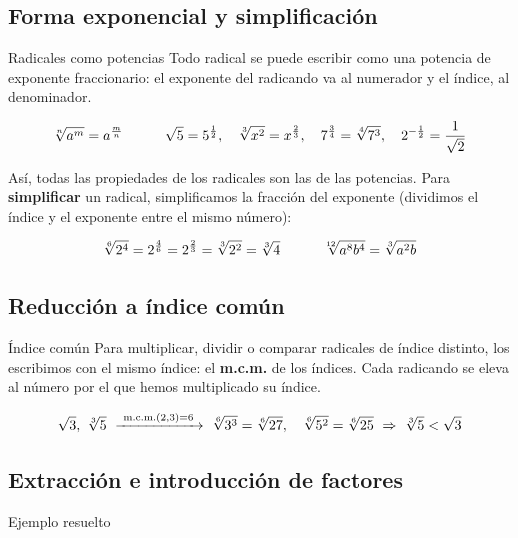 \documentclass[11pt,a4paper]{article}
\makeatletter
\newcommand{\lt}{<}\newcommand{\gt}{>}
\newcommand{\fmm}[1]{\setbox0=\hbox{$#1$}\ifdim\wd0>0.8\linewidth\def\fmmnext{\fmmdisp{#1}}\else\def\fmmnext{\mbox{\box0}}\fi\fmmnext}
\def\fmmdisp#1{\@ifnextchar.{\fmmdispp{#1}}{\@ifnextchar,{\fmmdispc{#1}}{\@ifnextchar;{\fmmdisps{#1}}{\fmdisp{#1}}}}}
\def\fmmdispp#1.{\fmdisp{#1\,.}}\def\fmmdispc#1,{\fmdisp{#1\,,}}\def\fmmdisps#1;{\fmdisp{#1\,;}}
\newcommand{\fmdisp}[1]{\[\setbox2=\hbox{$\displaystyle #1$}\ifdim\wd2>\linewidth\resizebox{\linewidth}{!}{\box2}\else\box2\fi\]}
\makeatother
\begin{document}
\Needspace{5.1cm}
\subsection*{Forma exponencial y simplificación}
\begin{fmdef}{Radicales como potencias}
Todo radical se puede escribir como una potencia de exponente fraccionario: el exponente del radicando va al numerador y el índice, al denominador.

\fmdisp{\sqrt[n]{a^m}=a^{\frac mn}\qquad\quad \sqrt5=5^{\frac12},\quad \sqrt[3]{x^2}=x^{\frac23},\quad 7^{\frac34}=\sqrt[4]{7^3},\quad 2^{-\frac12}=\dfrac{1}{\sqrt2}}

Así, todas las propiedades de los radicales son las de las potencias. Para \textbf{simplificar} un radical, simplificamos la fracción del exponente (dividimos el índice y el exponente entre el mismo número):

\fmdisp{\sqrt[6]{2^4}=2^{\frac46}=2^{\frac23}=\sqrt[3]{2^2}=\sqrt[3]4\qquad\quad \sqrt[12]{a^8b^4}=\sqrt[3]{a^2b}}

\end{fmdef}

\Needspace{5.1cm}
\subsection*{Reducción a índice común}
\begin{fmdef}{Índice común}
Para multiplicar, dividir o comparar radicales de índice distinto, los escribimos con el mismo índice: el \textbf{m.c.m.} de los índices. Cada radicando se eleva al número por el que hemos multiplicado su índice.

\fmdisp{\sqrt{3},\ \sqrt[3]{5}\ \xrightarrow{\ \text{m.c.m.}(2,3)=6\ }\ \sqrt[6]{3^3}=\sqrt[6]{27},\quad \sqrt[6]{5^2}=\sqrt[6]{25}\ \Rightarrow\ \sqrt[3]5\lt\sqrt3}

\end{fmdef}

\Needspace{5.1cm}
\subsection*{Extracción e introducción de factores}
\begin{fmex}{Ejemplo resuelto}
\end{fmex}
\end{document}
